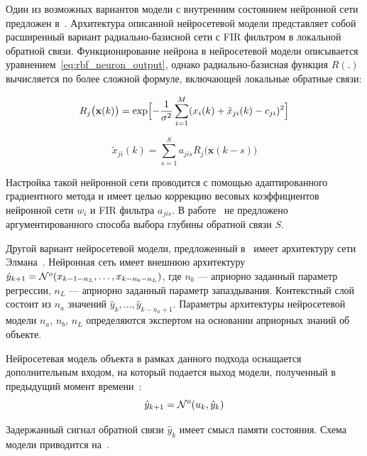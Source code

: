 
Один из возможных вариантов модели с внутренним состоянием нейронной
сети предложен в~\cite{boquete99}.  Архитектура описанной нейросетевой
модели представляет собой расширенный вариант радиально-базисной сети
с FIR фильтром в локальной обратной связи.  Функционирование нейрона в
нейросетевой модели описывается
уравнением~\eqref{eq:rbf_neuron_output}, однако радиально-базисная
функция $R(.)$ вычисляется по более сложной формуле, включающей
локальные обратные связи:

$$
R_j\bigl(\mathbf{x}(k)\bigr)=
   \exp\Bigl[-\frac{1}{\sigma^2}\sum\limits_{i=1}^M
             (x_i(k)+\tilde{x}_{ji}(k)-c_{ji})^2\Bigr]
$$

$$
\tilde{x}_{ji}(k)=\sum\limits_{s=1}^S a_{jis}R_j\bigl(\mathbf{x}(k-s)\bigr)
$$

Настройка такой нейронной сети проводится с помощью адаптированного
градиентного метода и имеет целью коррекцию весовых коэффициентов
нейронной сети $w_i$ и FIR фильтра $a_{jis}$.  В
работе~\cite{boquete99} не предложено аргументированного способа
выбора глубины обратной связи $S$.

Другой вариант нейросетевой модели, предложенный в~\cite{benne00}
имеет архитектуру сети Элмана~\cite{golovko01}.  Нейронная сеть имеет
внешнюю архитектуру
$\hat{y}_{k+1}=\mathcal{N}^o(x_{k-1-n_L},\ldots,x_{k-n_b-n_L})$, где $n_b$ ---
априорно заданный параметр регрессии, $n_L$ --- априорно заданный
параметр запаздывания.  Контекстный слой состоит из $n_a$ значений
$\hat{y}_{k},\ldots,\hat{y}_{k-n_a+1}$.  Параметры архитектуры
нейросетевой модели $n_a$, $n_b$, $n_L$ определяются экспертом на
основании априорных знаний об объекте.


Нейросетевая модель объекта в рамках данного подхода оснащается
дополнительным входом, на который подается выход модели,
полученный в предыдущий момент времени~\cite{sigom00}:
$$ \hat{y}_{k+1}=\mathcal{N}^o(u_k, \hat{y}_k) $$

Задержанный сигнал обратной связи $\hat{y}_k$ имеет смысл памяти
состояния.  Схема модели приводится на~.

